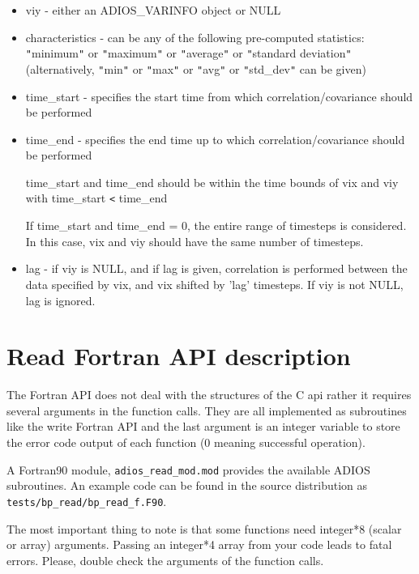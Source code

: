 \begin{itemize}
\item viy - either an ADIOS\_VARINFO object or NULL 

\item characteristics - can be any of the following pre-computed 
statistics: \texttt{"}minimum\texttt{"} or \texttt{"}maximum\texttt{"} or \texttt{"}average\texttt{"} 
or \texttt{"}standard deviation\texttt{"} (alternatively, \texttt{"}min\texttt{"} 
or \texttt{"}max\texttt{"} or \texttt{"}avg\texttt{"} or \texttt{"}std\_dev\texttt{"} 
can be given)

\item time\_start - specifies the start time from which correlation/covariance 
should be performed

\item time\_end - specifies the end time up to which correlation/covariance 
should be performed

time\_start and time\_end should be within the time bounds of vix and viy with 
time\_start \texttt{<} time\_end

If time\_start and time\_end = 0, the entire range of timesteps is considered. 
In this case, vix and viy should have the same number of timesteps.

\item lag - if viy is NULL, and if lag is given, correlation is performed 
between the data specified by vix, and vix shifted by 'lag' timesteps.  If viy 
is not NULL, lag is ignored.
\end{itemize}


\section{Read Fortran API description}
\label{section:read_fortran_api}

The Fortran API does not deal with the structures of the C api rather it requires 
several arguments in the function calls.  They are all implemented as subroutines 
like the write Fortran API and the last argument is an integer variable to store 
the error code output of each function (0 meaning successful operation). 

A Fortran90 module, \verb+adios_read_mod.mod+ provides the available ADIOS subroutines. 
An example code can be found in the source distribution as 
\verb+tests/bp_read/bp_read_f.F90+.

The most important thing to note is that some functions need integer*8 (scalar 
or array) arguments. Passing an integer*4 array from your code leads to fatal errors. 
Please, double check the arguments of the function calls. 

